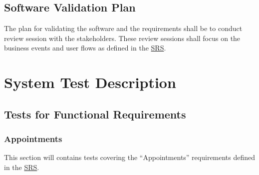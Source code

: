 \documentclass[12pt, titlepage]{article}
\begin{document}
\subsection{Software Validation Plan}

The plan for validating the software and the requirements shall be to conduct review session with
the stakeholders. These review sessions shall focus on the business events and user flows as
defined in the \href{https://github.com/arkinmodi/project-sayyara/blob/main/docs/SRS/SRS.pdf}{SRS}.

\section{System Test Description} \label{System Test Description}

\subsection{Tests for Functional Requirements} \label{Tests for Functional Requirements}



\subsubsection{Appointments}

This section will contains tests covering the ``Appointments'' requirements defined in the
\href{https://github.com/arkinmodi/project-sayyara/blob/main/docs/SRS/SRS.pdf}{SRS}.
\end{document}
